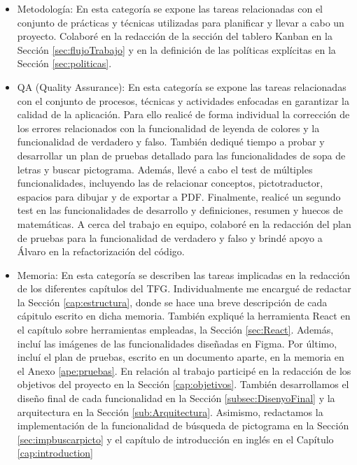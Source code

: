\begin{itemize}
    \item Metodología: En esta categoría se expone las tareas relacionadas con el conjunto de prácticas y técnicas utilizadas para planificar y llevar a cabo un proyecto. Colaboré en la redacción de la sección del tablero Kanban en la Sección \ref{sec:flujoTrabajo} y en la definición de las políticas explícitas en la Sección \ref{sec:politicas}.
    \item QA (Quality Assurance): En esta categoría se expone las tareas relacionadas con el conjunto de procesos, técnicas y actividades enfocadas en garantizar la calidad de la aplicación. Para ello realicé de forma individual la corrección de los errores relacionados con la funcionalidad de leyenda de colores y la funcionalidad de verdadero y falso. También dediqué tiempo a probar y desarrollar un plan de pruebas detallado para las funcionalidades de sopa de letras y buscar pictograma. Además, llevé a cabo el test de múltiples funcionalidades, incluyendo las de relacionar conceptos, pictotraductor, espacios para dibujar y de exportar a PDF. Finalmente, realicé un segundo test en las funcionalidades de desarrollo y definiciones, resumen y huecos de matemáticas. A cerca del trabajo en equipo, colaboré en la redacción del plan de pruebas para la funcionalidad de verdadero y falso y brindé apoyo a Álvaro en la refactorización del código.
    \item Memoria: En esta categoría se describen las tareas implicadas en la redacción de los diferentes capítulos del TFG. Individualmente me encargué de redactar la Sección \ref{cap:estructura}, donde se hace una breve descripción de cada cápitulo escrito en dicha memoria. También expliqué la herramienta React en el capítulo sobre herramientas empleadas, la Sección \ref{sec:React}. Además, incluí las imágenes de las funcionalidades diseñadas en Figma. Por último, incluí el plan de pruebas, escrito en un documento aparte, en la memoria en el Anexo \ref{ape:pruebas}. En relación al trabajo participé en la redacción de los objetivos del proyecto en la Sección \ref{cap:objetivos}. También desarrollamos el diseño final de cada funcionalidad en la Sección \ref{subsec:DisenyoFinal} y la arquitectura en la Sección \ref{sub:Arquitectura}. Asimismo, redactamos la implementación de la funcionalidad de búsqueda de pictograma en la Sección \ref{sec:impbuscarpicto} y el capítulo de introducción en inglés en el Capítulo \ref{cap:introduction}

\end{itemize}



